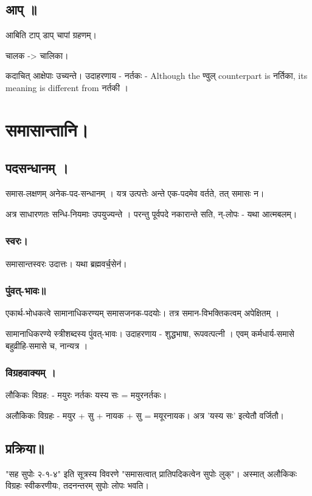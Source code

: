 \documentclass[oneside, article]{memoir}
\begin{document}
\subsection{आप् ॥}
आबिति टाप् डाप् चापां ग्रहणम्। 

चालक -> चालिका।

कदाचित् आक्षेपाः उच्यन्ते। उदाहरणाय - नर्तकः - Although the ण्वुल्  counterpart is नर्तिका, its meaning is
different from नर्तकी ।


\section{समासान्तानि।}
\subsection{पदसन्धानम् ।}
समास-लक्षणम् अनेक-पद-सन्धानम् । यत्र उत्पत्तेः अन्ते एक-पदमेव वर्तते, तत् समासः न।

अत्र साधारणतः सन्धि-नियमाः उपयुज्यन्ते । परन्तु पूर्वपदे नकारान्ते सति, न्-लोपः - यथा आत्मबलम्।

\subsubsection{स्वरः।}
समासान्तस्वरः उदात्तः। यथा ब्रह्मवर्च॒सेन॑।

\subsubsection{पुंवत्-भावः॥}
एकार्थ-भोधकत्वे सामानाधिकरण्यम् समासजनक-पदयोः। तत्र समान-विभक्तिकत्वम्‌ अपेक्षितम् ।

सामानाधिकरण्ये स्त्रीशब्दस्य पुंवत्-भावः। उदाहरणाय - शुद्धभाषा, रूपवत्पत्नी । एवम् कर्मधार्य-समासे बहुव्रीहि-समासे च, नान्यत्र ।

\subsubsection{विग्रहवाक्यम् ।}
लौकिकः विग्रह: - मयुरः नर्तकः यस्य सः = मयुरनर्तकः।

अलौकिकः विग्रहः - मयुर + सु + नायक + सु = मयूरनायक। अत्र 'यस्य सः' इत्येतौ वर्जितौ।

\subsection{प्रक्रिया॥}
"सह सुपोः २-१-४" इति सूत्रस्य विवरणे "समासत्वात् प्रातिपदिकत्वेन सुपोः लुक्"। अस्मात् अलौकिकः विग्रहः स्वीकरणीयः, तदनन्तरम् सुपोः लोपः भवति।
\end{document}
